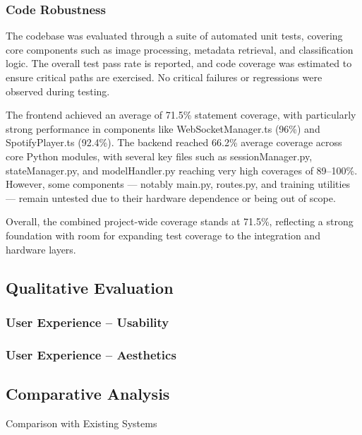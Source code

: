             \subsubsection{Code Robustness}
    
                The codebase was evaluated through a suite of automated unit tests, covering core components such as image processing, metadata retrieval, and classification logic. The overall test pass rate is reported, and code coverage was estimated to ensure critical paths are exercised. No critical failures or regressions were observed during testing.
    
                The frontend achieved an average of 71.5\% statement coverage, with particularly strong performance in components like WebSocketManager.ts (96\%) and SpotifyPlayer.ts (92.4\%). The backend reached 66.2\% average coverage across core Python modules, with several key files such as sessionManager.py, stateManager.py, and modelHandler.py reaching very high coverages of 89–100\%. However, some components — notably main.py, routes.py, and training utilities — remain untested due to their hardware dependence or being out of scope.
                
                Overall, the combined project-wide coverage stands at 71.5\%, reflecting a strong foundation with room for expanding test coverage to the integration and hardware layers.
    
        \subsection{Qualitative Evaluation}
        
            \subsubsection{User Experience -- Usability}
    
            \subsubsection{User Experience -- Aesthetics}
            
        \subsection{Comparative Analysis}
            \begin{temp}
                Comparison with Existing Systems
            \end{temp}
    
